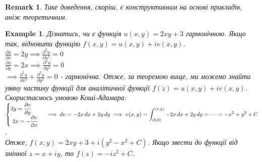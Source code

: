 \documentclass[a4paper, 10pt]{article}
\theoremstyle{theoremdd}
\theoremstyle{theoremdd}
\theoremstyle{theoremdd}
\theoremstyle{theoremdd}
\newtheorem{example}[theorem]{Example}
\theoremstyle{theoremdd}
\theoremstyle{theoremdd}
\newtheorem{remark}[theorem]{Remark}
\theoremstyle{theoremdd}
\theoremstyle{theoremdd}
\begin{document}
\begin{remark}
Таке доведення, скоріш, є конструктивним на основі прикладів, аніж теоретичним.
\end{remark}

\begin{example}
Дізнатись, чи є функція $u(x,y)=2xy+3$ гармонічною. Якщо так, відновити функцію $f(x,y) = u(x,y)+iv(x,y)$.\\
	$\displaystyle\frac{\partial u}{\partial x} = 2y \implies \frac{\partial^2 u}{\partial x^2} = 0$\\
	$\displaystyle\frac{\partial u}{\partial y} = 2x \implies \frac{\partial^2 u}{\partial y^2} = 0$\\
	$\implies \displaystyle\frac{\partial^2 u}{\partial x^2} + \frac{\partial^2 u}{\partial y^2} = 0$ - гармонічна. Отже, за теоремою вище, ми можемо знайти уявну частину функції для аналітичної функції $f(z)=u(x,y)+iv(x,y)$. Скористаємось умовою Коші-Адамара:\\
		$
	\begin{cases}
		\displaystyle 2y = \frac{\partial v}{\partial y}\\
		\displaystyle\ 2x = -\frac{\partial v}{\partial x}\\
	\end{cases} \implies dv = -2x\,dx + 2y\,dy\\
	\displaystyle \implies v(x,y) = \int_{(0,0)}^{(x,y)}-2x\,dx+2y\,dy=\cdots=-x^2+y^2+C
	$.\\
	Отже, $f(x,y) = 2xy+3+i(y^2-x^2+C)$. Якщо звести до функції від змінної $z = x+iy$, то $f(z) = -iz^2+C$.
\end{example}
	
\end{document}
